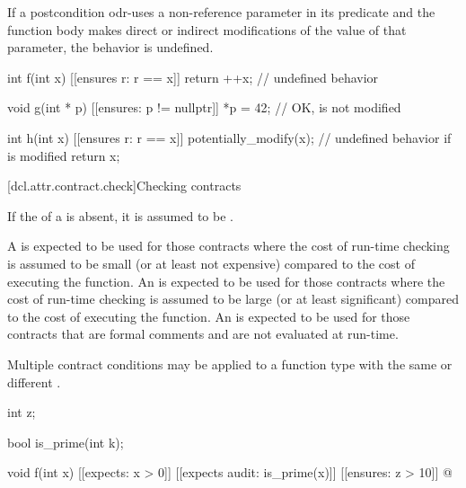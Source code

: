 \pnum
If a postcondition odr-uses
a non-reference parameter in its predicate
and the function body makes direct or indirect modifications of
the value of that parameter,
the behavior is undefined.
\begin{example}
\begin{codeblock}
int f(int x)
  [[ensures r: r == x]]
{
  return ++x;                   // undefined behavior
}

void g(int * p)
  [[ensures: p != nullptr]]
{
  *p = 42;                      // OK,  is not modified
}

int h(int x)
  [[ensures r: r == x]]
{
  potentially_modify(x);        // undefined behavior if  is modified
  return x;
}
\end{codeblock}
\end{example}

[dcl.attr.contract.check]{Checking contracts}

\pnum
If the 
of a  is absent,
it is assumed to be .
\begin{note}
A   is expected to be used
for those contracts where
the cost of run-time checking is assumed to be
small (or at least not expensive) compared to
the cost of executing the function.
An   is expected to be used
for those contracts where
the cost of run-time checking is assumed to be
large (or at least significant) compared to
the cost of executing the function.
An   is expected to be used
for those contracts that are formal comments
and are not evaluated at run-time.
\end{note}

\pnum
\begin{note}
Multiple contract conditions may be applied to a function type
with the same or different .
\begin{example}
\begin{codeblock}
int z;

bool is_prime(int k);

void f(int x)
  [[expects: x > 0]]
  [[expects audit: is_prime(x)]]
  [[ensures: z > 10]]
{
  @\commentellip@
}
\end{codeblock}
\end{example}
\end{note}

